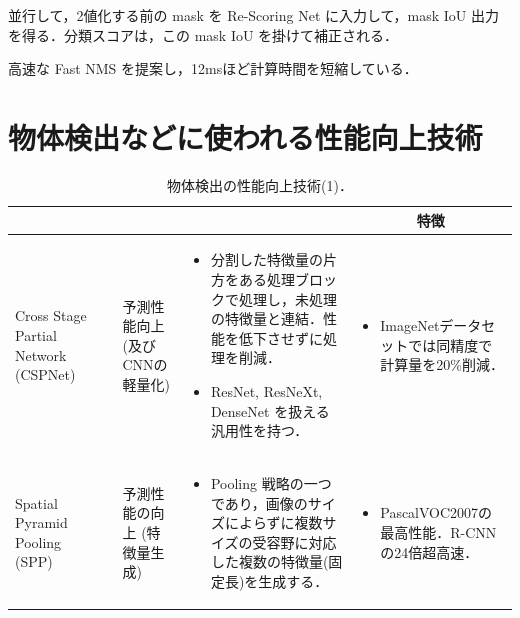 \documentclass[twocolumn]{jsarticle} %
\begin{document}
並行して，2値化する前の mask を Re-Scoring Net に入力して，mask IoU 出力を得る．分類スコアは，この mask IoU を掛けて補正される．

高速な Fast NMS を提案し，12msほど計算時間を短縮している．
\section{物体検出などに使われる性能向上技術}
\begin{table}
    \caption{物体検出の性能向上技術(1)．}
    \label{tbl-option1}
    \begin{center}
        \setlength{\tabcolsep}{3pt}
        \footnotesize
        \begin{tabularx}{\linewidth}{XcXp{7cm}X} \toprule
            \centering{技術名称} & \centering{文献} & \centering{用途} & \centering{概要} & \multicolumn{1}{c}{特徴} \\ \midrule

            Cross Stage Partial Network (CSPNet) 
            & \cite{WLWCHY20} & 予測性能向上 (及びCNNの軽量化) & 
            \begin{itemize}
                \vspace{-0.7\baselineskip}
                \setlength{\leftskip}{-3mm}
                \item 分割した特徴量の片方をある処理ブロックで処理し，未処理の特徴量と連結．性能を低下させずに処理を削減．
                \item ResNet, ResNeXt, DenseNet を扱える汎用性を持つ．
            \end{itemize}
            &
            \begin{itemize}
                \vspace{-0.7\baselineskip}
                \setlength{\leftskip}{-3mm}
                \item ImageNetデータセットでは同精度で計算量を20\%削減．
            \end{itemize}
            \\

            Spatial Pyramid Pooling (SPP)
            & \cite{HZRS15,HZRS14} & 予測性能の向上 (特徴量生成) & 
            \begin{itemize}
                \vspace{-0.7\baselineskip}
                \setlength{\leftskip}{-3mm}
                \item Pooling 戦略の一つであり，画像のサイズによらずに複数サイズの受容野に対応した複数の特徴量(固定長)を生成する．
            \end{itemize}
            &
            \begin{itemize}
                \vspace{-0.7\baselineskip}
                \setlength{\leftskip}{-3mm}
                \item PascalVOC2007の最高性能．R-CNNの24倍超高速．
            \end{itemize}
            \\


\end{tabularx}
\end{center}
\end{table}
\end{document}
